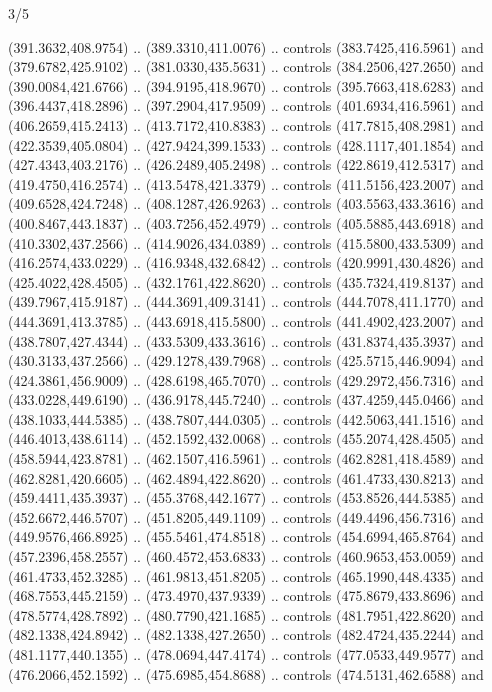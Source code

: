 \begin{flagdescription}{3/5}
\begin{scope}[xshift=0.5\flaglength]
\begin{scope}[scale=0.00167\flagwidth,yshift=210.9mm,xshift=-175.8mm]
\begin{scope}[y=-1pt, x=1pt]
  (391.3632,408.9754) .. (389.3310,411.0076) .. controls (383.7425,416.5961) and
  (379.6782,425.9102) .. (381.0330,435.5631) .. controls (384.2506,427.2650) and
  (390.0084,421.6766) .. (394.9195,418.9670) .. controls (395.7663,418.6283) and
  (396.4437,418.2896) .. (397.2904,417.9509) .. controls (401.6934,416.5961) and
  (406.2659,415.2413) .. (413.7172,410.8383) .. controls (417.7815,408.2981) and
  (422.3539,405.0804) .. (427.9424,399.1533) .. controls (428.1117,401.1854) and
  (427.4343,403.2176) .. (426.2489,405.2498) .. controls (422.8619,412.5317) and
  (419.4750,416.2574) .. (413.5478,421.3379) .. controls (411.5156,423.2007) and
  (409.6528,424.7248) .. (408.1287,426.9263) .. controls (403.5563,433.3616) and
  (400.8467,443.1837) .. (403.7256,452.4979) .. controls (405.5885,443.6918) and
  (410.3302,437.2566) .. (414.9026,434.0389) .. controls (415.5800,433.5309) and
  (416.2574,433.0229) .. (416.9348,432.6842) .. controls (420.9991,430.4826) and
  (425.4022,428.4505) .. (432.1761,422.8620) .. controls (435.7324,419.8137) and
  (439.7967,415.9187) .. (444.3691,409.3141) .. controls (444.7078,411.1770) and
  (444.3691,413.3785) .. (443.6918,415.5800) .. controls (441.4902,423.2007) and
  (438.7807,427.4344) .. (433.5309,433.3616) .. controls (431.8374,435.3937) and
  (430.3133,437.2566) .. (429.1278,439.7968) .. controls (425.5715,446.9094) and
  (424.3861,456.9009) .. (428.6198,465.7070) .. controls (429.2972,456.7316) and
  (433.0228,449.6190) .. (436.9178,445.7240) .. controls (437.4259,445.0466) and
  (438.1033,444.5385) .. (438.7807,444.0305) .. controls (442.5063,441.1516) and
  (446.4013,438.6114) .. (452.1592,432.0068) .. controls (455.2074,428.4505) and
  (458.5944,423.8781) .. (462.1507,416.5961) .. controls (462.8281,418.4589) and
  (462.8281,420.6605) .. (462.4894,422.8620) .. controls (461.4733,430.8213) and
  (459.4411,435.3937) .. (455.3768,442.1677) .. controls (453.8526,444.5385) and
  (452.6672,446.5707) .. (451.8205,449.1109) .. controls (449.4496,456.7316) and
  (449.9576,466.8925) .. (455.5461,474.8518) .. controls (454.6994,465.8764) and
  (457.2396,458.2557) .. (460.4572,453.6833) .. controls (460.9653,453.0059) and
  (461.4733,452.3285) .. (461.9813,451.8205) .. controls (465.1990,448.4335) and
  (468.7553,445.2159) .. (473.4970,437.9339) .. controls (475.8679,433.8696) and
  (478.5774,428.7892) .. (480.7790,421.1685) .. controls (481.7951,422.8620) and
  (482.1338,424.8942) .. (482.1338,427.2650) .. controls (482.4724,435.2244) and
  (481.1177,440.1355) .. (478.0694,447.4174) .. controls (477.0533,449.9577) and
  (476.2066,452.1592) .. (475.6985,454.8688) .. controls (474.5131,462.6588) and

\end{scope}
\end{scope}
\end{scope}
\end{flagdescription}
